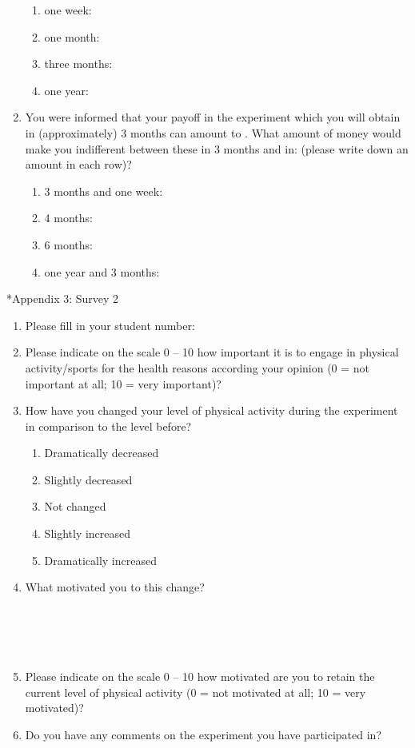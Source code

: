 \documentclass[12pt,english]{article}%
\makeatletter
\renewcommand{\subsection}{\@startsection{subsection}{2}{0mm}{-0.1\baselineskip}{0.5\baselineskip}{\normalfont\bf\flushleft}}
\makeatother
\begin{document}
\begin{enumerate}
\begin{enumerate}
\item one week:
\item one month:
\item three months:
\item one year: 
\end{enumerate}
\item You were informed that your payoff in the experiment which you will obtain in (approximately) 3 months can amount to . What amount of money would make you indifferent between these  in 3 months and in: (please write down an amount in each row)?
\begin{enumerate}
\item 3 months and one week:
\item 4 months:
\item 6 months:
\item one year and 3 months:
\end{enumerate}
\end{enumerate}
\pagebreak
\subsection*{Appendix 3: Survey 2}
\begin{enumerate}
\item Please fill in your student number:
\item Please indicate on the scale 0 -- 10 how important it is to engage in physical activity/sports for the health reasons according your opinion (0 = not important at all; 10 = very important)?
\item How have you changed your level of physical activity during the experiment in comparison to the level before?
\begin{enumerate}
\item Dramatically decreased
\item Slightly decreased
\item Not changed
\item Slightly increased
\item Dramatically increased
\end{enumerate}
\item What motivated you to this change?\\\\\\\\\\
\item Please indicate on the scale 0 -- 10 how motivated are you to retain the current level of physical activity (0 = not motivated at all; 10 = very motivated)?
\item Do you have any comments on the experiment you have participated in?
\end{enumerate}
\pagebreak
\end{document}
